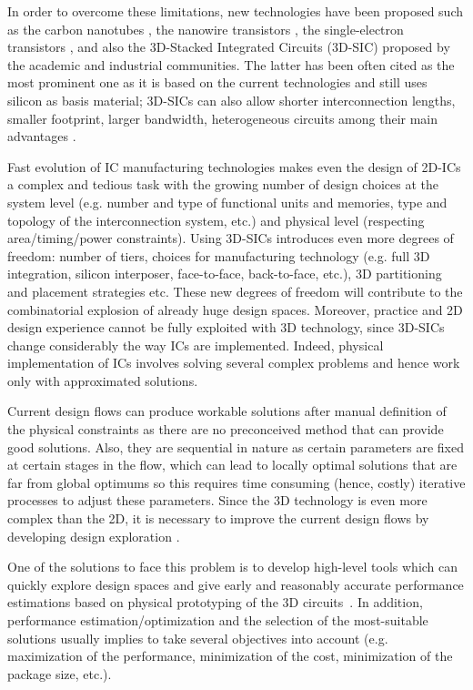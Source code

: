 \documentclass{svmult}
\begin{document}
In order to overcome these limitations, new technologies have been proposed such as the carbon nanotubes \cite{tans1998room}, the nanowire transistors \cite{doi:10.1021/nl025875l}, the single-electron transistors \cite{citeulike:4194929}, and also the 3D-Stacked Integrated Circuits (3D-SIC) proposed by the academic and industrial communities. The latter has been often cited as the most prominent one as it is based on the current technologies and still uses silicon as basis material; 3D-SICs can also allow shorter interconnection lengths, smaller footprint, larger bandwidth, heterogeneous circuits among their main advantages \cite{659500,1652906,981091,4299568}.

Fast evolution of IC manufacturing technologies makes even the design of 2D-ICs a complex and tedious task with the growing number of design choices at the system level (e.g. number and type of functional units and memories, type and topology of the interconnection system, etc.) and physical level (respecting area/timing/power constraints). Using 3D-SICs introduces even more degrees of freedom: number of tiers, choices for manufacturing technology (e.g. full 3D integration, silicon interposer, face-to-face, back-to-face, etc.), 3D partitioning and placement strategies etc. These new degrees of freedom will contribute to the combinatorial explosion of already huge design spaces. Moreover, practice and 2D design experience cannot be fully exploited with 3D technology, since 3D-SICs change considerably the way ICs are implemented. Indeed, physical implementation of ICs involves solving several complex problems and hence work only with approximated solutions.

Current design flows can produce workable solutions after manual definition of the physical constraints as there are no preconceived method that can provide good solutions. Also, they are sequential in nature as certain parameters are fixed at certain stages in the flow, which can lead to locally optimal solutions that are far from global optimums so this requires time consuming (hence, costly) iterative processes to adjust these parameters. Since the 3D technology is even more complex than the 2D, it is necessary to improve the current design flows by developing design exploration \cite{PFF10}.

One of the solutions to face this problem is to develop high-level tools which can quickly explore design spaces and give early and reasonably accurate performance estimations based on physical prototyping of the 3D circuits~\cite{PFF10}. In addition, performance estimation/optimization and the selection of the most-suitable solutions usually implies to take several objectives into account (e.g. maximization of the performance, minimization of the cost, minimization of the package size, etc.).
\end{document}
